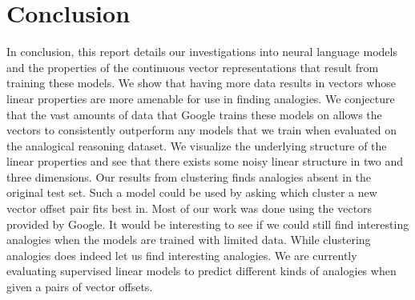 \section{Conclusion}

In conclusion, this report details our investigations into neural language models and the properties of the continuous vector representations that result from training these models. We show that having more data results in vectors whose linear properties are more amenable for use in finding analogies. We conjecture that the vast amounts of data that Google trains these models on allows the vectors to consistently outperform any models that we train when evaluated on the analogical reasoning dataset. We visualize the underlying structure of the linear properties and see that there exists some noisy linear structure in two and three dimensions. Our results from  clustering finds analogies absent in the original test set. Such a model could be used by asking which cluster a new vector offset pair fits best in. Most of our work was done using the vectors provided by Google. It would be interesting to see if we could still find interesting analogies when the models are trained with limited data. While clustering analogies does indeed let us find interesting analogies. We are currently evaluating supervised linear models to predict different kinds of analogies when given a pairs of vector offsets. 